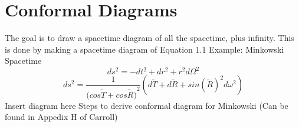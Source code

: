 \documentclass[10pt]{article}
\begin{document}
               	\section{Conformal Diagrams}\label{sec:class_style}
               	The goal is to draw a spacetime diagram of all the spacetime, plus infinity. This is done by making a spacetime diagram of Equation 1.1
              Example: Minkowski Spacetime
              \begin{equation}
                  ds^2=-dt^2+dr^2+r^2d\Omega^2
              \end{equation}
              \begin{equation}
                  ds^2=\frac{1}{(cos{\tilde{T}}+cos{\tilde{R})}^2}(d\tilde{T}+d\tilde{R}+sin(\tilde{R})^2d\omega^2)
              \end{equation}
               	Insert diagram here
               	Steps to derive conformal diagram for Minkowski
               	(Can be found in Appedix H of Carroll)
\end{document}
